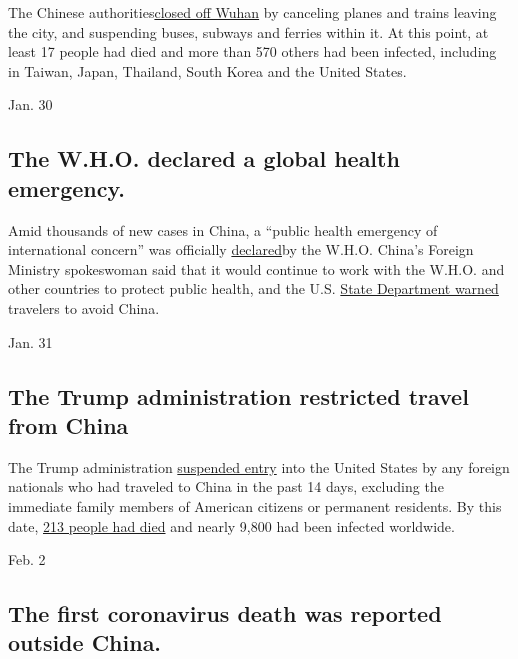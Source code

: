 The Chinese
authorities\href{https://www.nytimes3xbfgragh.onion/2020/01/22/world/asia/china-coronavirus-travel.html}{closed
off Wuhan} by canceling planes and trains leaving the city, and
suspending buses, subways and ferries within it. At this point, at least
17 people had died and more than 570 others had been infected, including
in Taiwan, Japan, Thailand, South Korea and the United States.

Jan. 30

\hypertarget{the-who-declared-a-global-health-emergency}{%
\subsection{The W.H.O. declared a global health
emergency.}\label{the-who-declared-a-global-health-emergency}}

Amid thousands of new cases in China, a ``public health emergency of
international concern'' was officially
\href{https://www.nytimes3xbfgragh.onion/2020/01/30/health/coronavirus-world-health-organization.html}{declared}by
the W.H.O. China's Foreign Ministry spokeswoman said that it would
continue to work with the W.H.O. and other countries to protect public
health, and the U.S.
\href{https://www.nytimes3xbfgragh.onion/2020/01/30/world/asia/Coronavirus-travel-advisory-.html}{State
Department warned} travelers to avoid China.

Jan. 31

\hypertarget{the-trump-administration-restricted-travel-from-china}{%
\subsection{The Trump administration restricted travel from
China}\label{the-trump-administration-restricted-travel-from-china}}

The Trump administration
\href{https://www.nytimes3xbfgragh.onion/2020/01/31/business/china-travel-coronavirus.html}{suspended
entry} into the United States by any foreign nationals who had traveled
to China in the past 14 days, excluding the immediate family members of
American citizens or permanent residents. By this date,
\href{https://www.nytimes3xbfgragh.onion/2020/01/30/world/asia/coronavirus-china.html\#link-6a63a9b7}{213
people had died} and nearly 9,800 had been infected worldwide.

Feb. 2

\hypertarget{the-first-coronavirus-death-was-reported-outside-china}{%
\subsection{The first coronavirus death was reported outside
China.}\label{the-first-coronavirus-death-was-reported-outside-china}}

